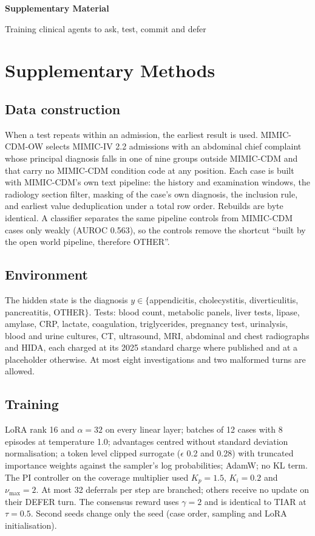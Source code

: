 \documentclass[11pt]{article}
\begin{document}
\RaggedRight
\begin{center}
{\Large\bfseries Supplementary Material\par}\vspace{4pt}
{\large Training clinical agents to ask, test, commit and defer\par}
\end{center}

\section*{Supplementary Methods}

\subsection*{Data construction}
When a test repeats within an admission, the earliest result is used. MIMIC-CDM-OW selects MIMIC-IV 2.2 admissions with an abdominal chief complaint whose principal diagnosis falls in one of nine groups outside MIMIC-CDM and that carry no MIMIC-CDM condition code at any position. Each case is built with MIMIC-CDM's own text pipeline: the history and examination windows, the radiology section filter, masking of the case's own diagnosis, the inclusion rule, and earliest value deduplication under a total row order. Rebuilds are byte identical. A classifier separates the same pipeline controls from MIMIC-CDM cases only weakly (AUROC 0.563), so the controls remove the shortcut ``built by the open world pipeline, therefore OTHER''.

\subsection*{Environment}
The hidden state is the diagnosis $y \in \{$appendicitis, cholecystitis, diverticulitis, pancreatitis, OTHER$\}$. Tests: blood count, metabolic panels, liver tests, lipase, amylase, CRP, lactate, coagulation, triglycerides, pregnancy test, urinalysis, blood and urine cultures, CT, ultrasound, MRI, abdominal and chest radiographs and HIDA, each charged at its 2025 standard charge where published and at a placeholder otherwise. At most eight investigations and two malformed turns are allowed.

\subsection*{Training}
LoRA rank 16 and $\alpha = 32$ on every linear layer; batches of 12 cases with 8 episodes at temperature 1.0; advantages centred without standard deviation normalisation; a token level clipped surrogate ($\epsilon$ 0.2 and 0.28) with truncated importance weights against the sampler's log probabilities; AdamW; no KL term. The PI controller on the coverage multiplier used $K_p = 1.5$, $K_i = 0.2$ and $\nu_{\max} = 2$. At most 32 deferrals per step are branched; others receive no update on their DEFER turn. The consensus reward uses $\gamma = 2$ and is identical to TIAR at $\tau = 0.5$. Second seeds change only the seed (case order, sampling and LoRA initialisation).
\end{document}
